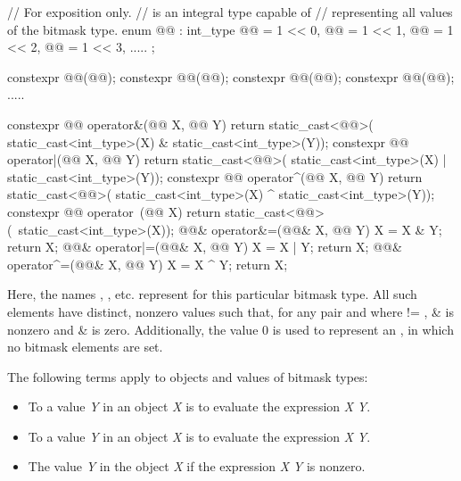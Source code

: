 \begin{codeblock}
// For exposition only.
//  is an integral type capable of
// representing all values of the bitmask type.
enum @@ : int_type {
  @@ = 1 << 0, @@ = 1 << 1, @@ = 1 << 2, @@ = 1 << 3, .....
};

constexpr @@(@@);
constexpr @@(@@);
constexpr @@(@@);
constexpr @@(@@);
  .....

constexpr @@ operator&(@@ X, @@ Y) {
  return static_cast<@@>(
    static_cast<int_type>(X) & static_cast<int_type>(Y));
}
constexpr @@ operator|(@@ X, @@ Y) {
  return static_cast<@@>(
    static_cast<int_type>(X) | static_cast<int_type>(Y));
}
constexpr @@ operator^(@@ X, @@ Y){
  return static_cast<@@>(
    static_cast<int_type>(X) ^ static_cast<int_type>(Y));
}
constexpr @@ operator~(@@ X){
  return static_cast<@@>(~static_cast<int_type>(X));
}
@@& operator&=(@@& X, @@ Y){
  X = X & Y; return X;
}
@@& operator|=(@@& X, @@ Y) {
  X = X | Y; return X;
}
@@& operator^=(@@& X, @@ Y) {
  X = X ^ Y; return X;
}
\end{codeblock}

\pnum
Here, the names , , etc. represent
for this particular bitmask type.
%
All such elements have distinct, nonzero values such that, for any pair 
and  where  != ,  \&  is nonzero and
 \&  is zero.
%
Additionally, the value 0 is used to represent an , in which no
bitmask elements are set.

\pnum
The following terms apply to objects and values of
bitmask types:

\begin{itemize}
\item
To
a value \textit{Y} in an object \textit{X}
is to evaluate the expression \textit{X} \tcode{|=} \textit{Y}.
\item
To
a value \textit{Y} in an object
\textit{X} is to evaluate the expression \textit{X} \tcode{\&= \~}\textit{Y}.
\item
The value \textit{Y}
in the object
\textit{X} if the expression \textit{X} \tcode{\&} \textit{Y} is nonzero.
\end{itemize}


